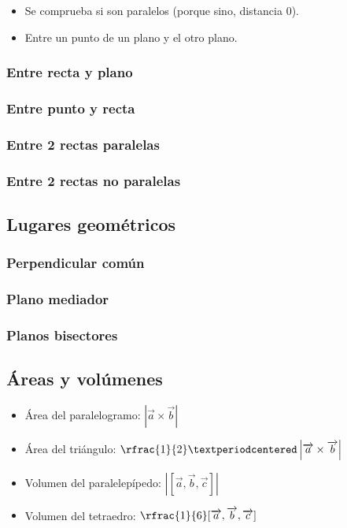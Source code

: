 \begin{itemize}
  \item Se comprueba si son paralelos (porque sino, distancia 0).
  \item Entre un punto de un plano y el otro plano.
\end{itemize}


\subsubsection{Entre recta y plano}
\subsubsection{Entre punto y recta}
\subsubsection{Entre 2 rectas paralelas}
\subsubsection{Entre 2 rectas no paralelas}

\subsection{Lugares geométricos}
\subsubsection{Perpendicular común}
\subsubsection{Plano mediador}
\subsubsection{Planos bisectores}

\subsection{Áreas y volúmenes}
\begin{itemize}
  \item Área del paralelogramo: $\left|\vec{a}\times\vec{b}\right|$
  \item Área del triángulo: $\rfrac{1}{2}·\left|\vec{a}\times\vec{b}\right|$
  \item Volumen del paralelepípedo: $\left|[\vec{a},\vec{b},\vec{c}]\right|$
  \item Volumen del tetraedro: $\rfrac{1}{6}[\vec{a},\vec{b},\vec{c}]$
\end{itemize}